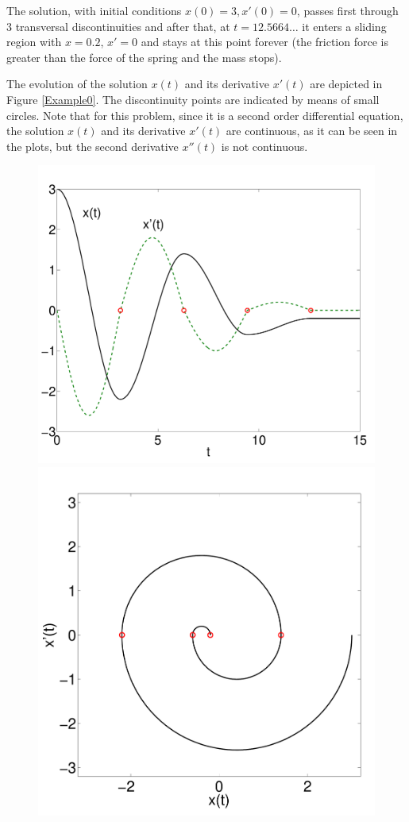 \documentclass{article}
\begin{document}
The solution, with initial conditions $x(0) = 3,  x'(0)= 0$,
passes first through 3 transversal discontinuities and after that, at $t=12.5664\ldots$ it enters a sliding
region with  $x=0.2$, $x'=0$ and stays at this point forever (the friction force is greater
than the force of the spring and the mass stops).

The evolution of the solution $x(t)$ and its derivative $x'(t)$ are depicted in Figure \ref{Example0}.  The discontinuity points are indicated by means of small circles. Note that for this problem, since it is a second order differential equation,  the solution $x(t)$ and its derivative $x'(t)$
are continuous, as it can be seen in the plots, but the second derivative $x''(t)$ is not continuous.
\begin{figure}[h]
\begin{center}
\includegraphics[width=6.2 true cm]{example0}
\quad
\includegraphics[width=5.4 true cm]{example0-phase}

\end{center}
\end{figure}
\end{document}
